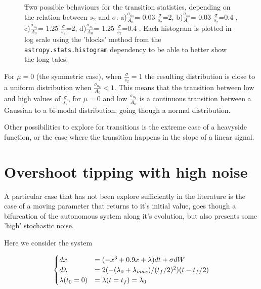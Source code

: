 \begin{figure}[H]
	\caption{ \sout{Two} possible behaviours for the transition statistics, depending on the relation between $s_2$ and $\sigma$. a)$\frac{\sigma_{n_0}}{A_0}$= 0.03 $\frac{\sigma}{s_2}$=2, b)$\frac{\sigma_{n_0}}{A_0}$= 0.03 $\frac{\sigma}{s_2}$=0.4 , c)$\frac{\sigma_{n_0}}{A_0}$= 1.25 $\frac{\sigma}{s_2}$=2,
		d)$\frac{\sigma_{n_0}}{A_0}$= 1.25 $\frac{\sigma}{s_2}$=0.4 . Each histogram is plotted in log scale using the 'blocks' method from the  \texttt{astropy.stats.histogram} dependency to be able to better show the long tales.  }
	\label{fig:transition_configurations}
\end{figure}
For $\mu=0$ (the symmetric case), when  $\frac{\sigma}{s_2}=1$ the resulting distribution is close to a uniform distribution when $\frac{\sigma_{n_0}}{A_0}<1$. This means that the transition between low and high values of $\frac{\sigma}{s_2}$, for $\mu=0$  and low $\frac{\sigma_{n_0}}{A_0}$ is a continuous transition between a Gaussian to a bi-modal distribution, going though a normal distribution.  

Other possibilities to explore for transitions is the extreme case of a heavyside function, or the case where the transition happens in the slope of a linear signal. 


\section{Overshoot tipping with high noise}

A particular case that has not been explore sufficiently in the literature is the case of a moving parameter that returns to it's initial value, goes though a bifurcation of the autonomous system along it's evolution, but also presents some 'high' stochastic noise. 



Here we consider the system 

\begin{equation}
	\begin{cases}
		dx&=(-x^3+0.9x+\lambda)dt+\sigma dW\\
		d\lambda&=2(-(\lambda_0+\lambda_{max})/(t_f/2)^2)(t-t_f/2)\\
		\lambda(t_0=0)&=\lambda(t=t_f)=\lambda_0
	\end{cases}
\end{equation} 

